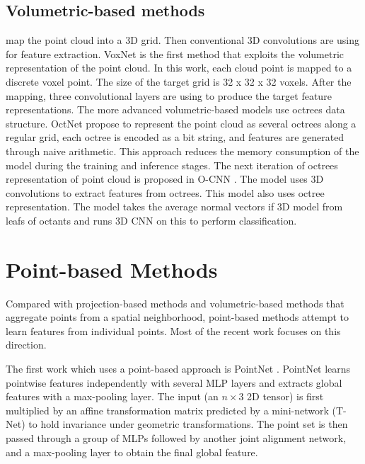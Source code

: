 \subsection{Volumetric-based methods} map the point cloud into a 3D grid. Then conventional 3D convolutions are using for feature extraction.
VoxNet \parencite{maturana_voxnet_2015} is the first method that exploits the volumetric representation of the point cloud. In this work, each cloud point is mapped to a discrete voxel point. The size of the target grid is 32 x 32 x 32 voxels. After the mapping, three convolutional layers are using to produce the target feature representations.
The more advanced volumetric-based models use octrees data structure. OctNet \parencite{riegler_octnet_2017} propose to represent the point cloud as several octrees along a regular grid, each octree is encoded as a bit string, and features are generated through naive arithmetic. This approach reduces the memory consumption of the model during the training and inference stages.
The next iteration of octrees representation of point cloud is proposed in O-CNN \parencite{wang_o-cnn_2017}. The model uses 3D convolutions to extract features from octrees. This model also uses octree representation. The model takes the average normal vectors if 3D model from leafs of octants and runs 3D CNN on this to perform classification.
% 
\section{Point-based Methods}
\label{Point-based Methods}
Compared with projection-based methods and volumetric-based methods that aggregate points from a spatial neighborhood, point-based methods attempt to learn features from individual points. Most of the recent work focuses on this direction.

The first work which uses a point-based approach is PointNet \parencite{qi_pointnet_2017}. PointNet learns pointwise features independently with several MLP layers and extracts global features with a max-pooling layer. The input (an $n \times 3$ 2D tensor) is first multiplied by an affine transformation matrix predicted by a mini-network (T-Net) to hold invariance under geometric transformations. The point set is then passed through a group of MLPs followed by another joint alignment network, and a max-pooling layer to obtain the final global feature.

